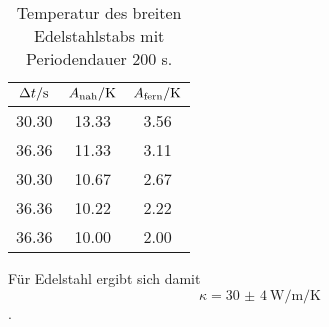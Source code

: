 \begin{table}

	\centering

	\caption{Temperatur des breiten Edelstahlstabs mit Periodendauer 200 s.}


	\begin{tabular}{S[table-format=3.2] S[table-format=3.2]S[table-format=3.2]}

		\toprule

		{$\Delta t/\si[per-mode=reciprocal]{\second}$}&{$A_\text{nah}/\si[per-mode=reciprocal]{\kelvin}$}&{$A_\text{fern}/\si[per-mode=reciprocal]{\kelvin}$} \\

		\midrule

		30.30 & 13.33 & 3.56 \\

		36.36 & 11.33 & 3.11 \\

		30.30 & 10.67 & 2.67 \\

		36.36 & 10.22 & 2.22 \\

		36.36 & 10.00 & 2.00 \\

		\bottomrule

	\end{tabular}

	\label{tab:tab4}

\end{table}

Für Edelstahl ergibt sich damit \[\kappa = \SI{30(4)}{\watt\per\metre\per\kelvin}\].